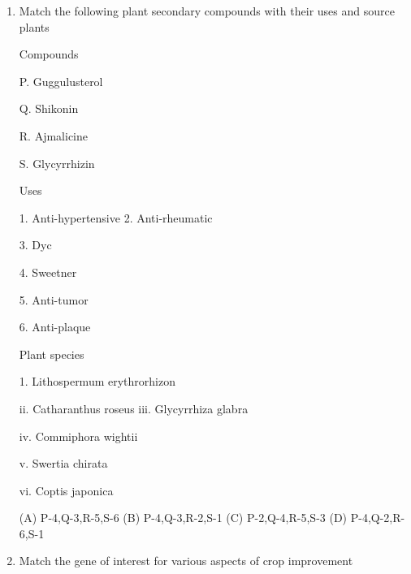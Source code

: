 \documentclass[journal]{IEEEtran}
\begin{document}
\begin{enumerate}
{S. Acceleration of DNA-coated microprojectiles is carried out with compressed CO

(A) P. S

(B) R. S

(C) P, R

(D) Q. S

}
\item {Match the following plant secondary compounds with their uses and source plants}
	\newline
\begin{minipage}{0.3\textwidth}
	\begin{flushleft}

Compounds

P. Guggulusterol

Q. Shikonin

R. Ajmalicine

S. Glycyrrhizin


		\end{flushleft}
		\end{minipage}
		\begin{minipage}{0.3\textwidth}
		\begin{flushleft}

Uses

1. Anti-hypertensive
2. Anti-rheumatic

3. Dyc

4. Sweetner

5. Anti-tumor

6. Anti-plaque
		\end{flushleft}
		\end{minipage}
		\begin{minipage}{0.5\textwidth}
		\begin{flushleft}
Plant species


1. Lithospermum erythrorhizon

ii. Catharanthus roseus
iii. Glycyrrhiza glabra

iv. Commiphora wightii

v. Swertia chirata

vi. Coptis japonica

		\end{flushleft}
		\end{minipage}
		\newline
(A) P-4,Q-3,R-5,S-6
(B) P-4,Q-3,R-2,S-1
(C) P-2,Q-4,R-5,S-3
(D) P-4,Q-2,R-6,S-1

\item{Match the gene of interest for various aspects of crop improvement}
	\begin{minipage}{0.5\textwidth}
	\begin{flushleft}


\end{flushleft}
\end{minipage}
\end{enumerate}
\end{document}
